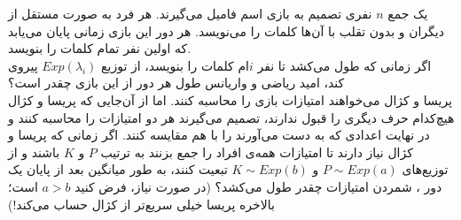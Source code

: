 \problem{}
یک جمع \( n \) نفری تصمیم به بازی اسم فامیل می‌گیرند. هر فرد به صورت مستقل از دیگران و بدون تقلب با آن‌ها کلمات را می‌نویسد. هر دور این بازی زمانی پایان می‌یابد که اولین نفر تمام کلمات را بنویسد.
\\
[5pt]
\subproblem{}
اگر زمانی که طول می‌کشد تا نفر \( i \)ام کلمات را بنویسد، از توزیع \( {Exp}(\lambda_i) \) پیروی کند، امید ریاضی و واریانس طول هر دور از این بازی چقدر است؟
\\
\subproblem{}
پریسا و کژال می‌خواهند امتیازات بازی را محاسبه کنند. 
اما از آن‌جایی که پریسا و کژال هیچ‌کدام حرف دیگری را قبول ندارند، تصمیم می‌گیرند هر دو امتیازات را
 محاسبه کنند و در نهایت اعدادی که به دست می‌آورند را با هم مقایسه کنند.
اگر زمانی که پریسا و کژال نیاز دارند
 تا امتیازات همه‌ی افراد را جمع بزنند به ترتیب \( P \) و \( K \) باشند و 
 از توزیع‌های \( P \sim {Exp}(a) \) و \( K \sim {Exp}(b) \) 
 تبعیت کنند، به طور میانگین بعد از پایان یک دور
 ، شمردن امتیازات چقدر طول می‌کشد؟ (در صورت نیاز، فرض کنید \( a > b \)
  است؛ بالاخره پریسا خیلی سریع‌تر از کژال حساب می‌کند!)

